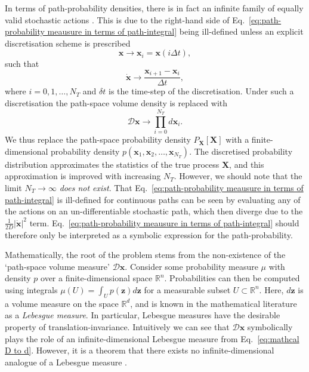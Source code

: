 In terms of path-probability densities, there is in fact an infinite family of equally valid stochastic actions \citep{gladrowExperimentalMeasurementRelative2021}. This is due to the right-hand side of Eq.~\ref{eq:path-probability meausure in terms of path-integral} being ill-defined unless an explicit discretisation scheme is prescribed
\begin{equation}
\mathbf{x} \longrightarrow \mathbf{x}_i = \mathbf{x}(i \Delta t),
\end{equation}
such that
\begin{equation}
\dot{\mathbf{x}} \longrightarrow \frac{\mathbf{x}_{i+1} - \mathbf{x}_i}{\Delta t},
\end{equation}
where $i=0, 1, \dots, N_T$ and $\delta t$ is the time-step of the discretisation. Under such a discretisation the path-space volume density is replaced with
\begin{equation} \label{eq:mathcal D to d}
\mathcal{D}\mathbf{x} \longrightarrow \prod_{i=0}^{N_T} d \mathbf{x}_i.
\end{equation}
We thus replace the path-space probability density $P_\mathbf{X}[\mathbf{X}]$ with a finite-dimensional probability density $p(\mathbf{x}_1, \mathbf{x}_2, \dots, \mathbf{x}_{N_T})$. The discretised probability distribution approximates the statistics of the true process $\mathbf{X}$, and this approximation is improved with increasing $N_T$. However, we should note that the limit $N_T \to \infty$ \textit{does not exist}. That Eq.~\ref{eq:path-probability meausure in terms of path-integral} is ill-defined for continuous paths can be seen by evaluating any of the actions on an un-differentiable stochastic path, which then diverge due to the $\frac{1}{2 D} |\dot{\mathbf{x}}|^2$ term. Eq.~\ref{eq:path-probability meausure in terms of path-integral} should therefore only be interpreted as a symbolic expression for the path-probability.

Mathematically, the root of the problem stems from the non-existence of the `path-space volume measure' $\mathcal{D} \mathbf{x}$. Consider some probability measure $\mu$ with density $p$ over a finite-dimensional space $\mathbb{R}^n$. Probabilities can then be computed using integrals $\mu(U) = \int_U p(\mathbf{z}) d \mathbf{z}$ for a measurable subset  $U \subset \mathbb{R}^n$. Here, $d \mathbf{z}$ is a volume measure on the space $\mathbb{R}^d$, and is known in the mathematical literature as a \textit{Lebesgue measure}. In particular, Lebesgue measures have the desirable property of translation-invariance. Intuitively we can see that $\mathcal{D} \mathbf{x}$ symbolically plays the role of an infinite-dimensional Lebesgue measure from Eq.~\ref{eq:mathcal D to d}. However, it is a theorem that there exists no infinite-dimensional analogue of a Lebesgue measure \citep{MeasureIntegrationTheory1972}.

